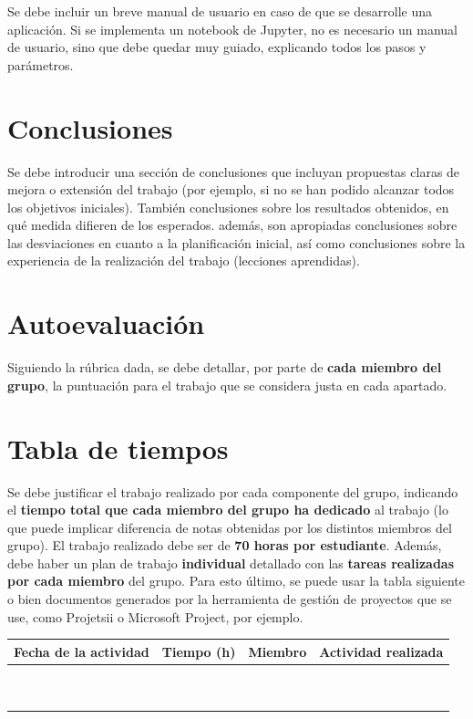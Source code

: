 \documentclass[a4paper]{article}
\begin{document}
Se debe incluir un breve manual de usuario en caso de que se desarrolle una aplicación. Si se implementa un notebook de Jupyter, no es necesario un manual de usuario, sino que debe quedar muy guiado, explicando todos los pasos y parámetros.  

\section{Conclusiones}

Se debe introducir una sección de conclusiones que incluyan propuestas claras de mejora o extensión del trabajo (por ejemplo, si no se han podido alcanzar todos los objetivos iniciales). También conclusiones sobre los resultados obtenidos, en qué medida difieren de los esperados. además, son apropiadas conclusiones sobre las desviaciones en cuanto a la planificación inicial, así como conclusiones sobre la experiencia de la realización del trabajo (lecciones aprendidas).

\section{Autoevaluación}

Siguiendo la rúbrica dada, se debe detallar, por parte de  \textbf{cada miembro del grupo}, la puntuación para el trabajo que se considera justa en cada apartado. 

\section{Tabla de tiempos}


Se debe justificar el trabajo realizado por cada componente del grupo, indicando el {\bf tiempo total que cada miembro del grupo ha dedicado} al trabajo (lo que puede implicar diferencia de notas obtenidas por los distintos miembros del grupo). El trabajo realizado debe ser de {\bf 70 horas por estudiante}. Además, debe haber un plan de trabajo \textbf{individual} detallado con las {\bf tareas realizadas por cada miembro} del grupo. Para esto último, se puede usar la tabla siguiente o bien documentos generados por la herramienta de gestión de proyectos que se use, como Projetsii o Microsoft Project, por ejemplo.

\begin{center}
\begin{tabular}{|c|c|c|c|}
\hline
 Fecha de la
 actividad 
& Tiempo (h)
& Miembro
& Actividad realizada
\\\hline
\mbox{ }&\mbox{}&\mbox{ }&\mbox{}\\
\mbox{ }&\mbox{}&\mbox{ }&\mbox{}\\\hline
\end{tabular}
\end{center}
\end{document}
